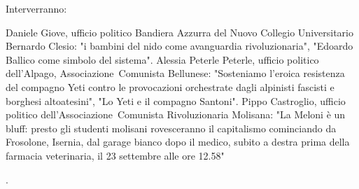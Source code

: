 \documentclass{article}
\begin{document}
Interverranno:
\begin{multicols}{3}Daniele Giove, ufficio politico Bandiera Azzurra del Nuovo Collegio Universitario Bernardo Clesio: "i bambini del nido come avanguardia rivoluzionaria", "Edoardo Ballico come simbolo del sistema".
\vfill\null
\columnbreak 
Alessia Peterle Peterle, ufficio politico dell'Alpago, Associazione\texttrademark\ Comunista Bellunese: "Sosteniamo l'eroica resistenza del compagno Yeti contro le provocazioni orchestrate dagli alpinisti fascisti e borghesi altoatesini", "Lo Yeti e il compagno Santoni".
\vfill\null
\columnbreak
Pippo Castroglio, ufficio politico dell'Associazione\texttrademark\ Comunista Rivoluzionaria Molisana: "La Meloni è un bluff: presto gli studenti molisani rovesceranno il capitalismo cominciando da Frosolone, Isernia, dal garage bianco dopo il medico, subito a destra prima della farmacia veterinaria, il 23 settembre alle ore 12.58"
\end{multicols}.
\end{document}
